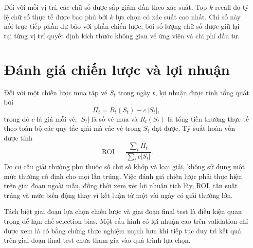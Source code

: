 Đối với mỗi vị trí, các chữ số được sắp giảm dần theo xác suất. Top-$k$ recall đo tỷ lệ chữ số thực tế được bao phủ bởi $k$ lựa chọn có xác suất cao nhất. Chỉ số này nối trực tiếp phần dự báo với phần chiến lược, bởi số lượng chữ số được giữ lại tại từng vị trí quyết định kích thước không gian vé ứng viên và chi phí đầu tư.

\section{Đánh giá chiến lược và lợi nhuận}
Đối với một chiến lược mua tập vé $S_t$ trong ngày $t$, lợi nhuận được tính tổng quát bởi
\[
\Pi_t=R_t(S_t)-c\,|S_t|,
\]
trong đó $c$ là giá mỗi vé, $|S_t|$ là số vé mua và $R_t(S_t)$ là tổng tiền thưởng thực tế theo toàn bộ các quy tắc giải mà các vé trong $S_t$ đạt được. Tỷ suất hoàn vốn được tính
\[
\operatorname{ROI}=\frac{\sum_t \Pi_t}{\sum_t c|S_t|}.
\]
Do cơ cấu giải thưởng phụ thuộc số chữ số khớp và loại giải, không sử dụng một mức thưởng cố định cho mọi lần trúng. Việc đánh giá chiến lược phải thực hiện trên giai đoạn ngoài mẫu, đồng thời xem xét lợi nhuận tích lũy, ROI, tần suất trúng và mức biến động thay vì kết luận từ một vài ngày có giải thưởng lớn.

Tách biệt giai đoạn lựa chọn chiến lược và giai đoạn final test là điều kiện quan trọng để hạn chế selection bias. Một cấu hình có lợi nhuận cao trên validation chỉ được xem là có bằng chứng thực nghiệm mạnh hơn khi tiếp tục duy trì kết quả trên giai đoạn final test chưa tham gia vào quá trình lựa chọn.